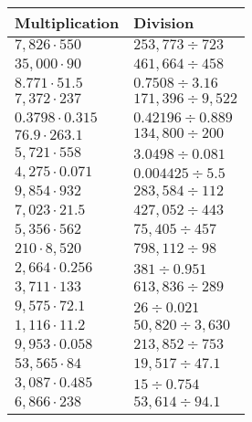 \begin{longtable}[]{@{}ll@{}}
\toprule
Multiplication & Division\tabularnewline
\midrule
\endhead
\(7,826\cdot550\) & \(253,773÷723\)\tabularnewline
\(35,000\cdot90\) & \(461,664÷458\)\tabularnewline
\(8.771\cdot51.5\) & \(0.7508÷3.16\)\tabularnewline
\(7,372\cdot237\) & \(171,396÷9,522\)\tabularnewline
\(0.3798\cdot0.315\) & \(0.42196÷0.889\)\tabularnewline
\(76.9\cdot263.1\) & \(134,800÷200\)\tabularnewline
\(5,721\cdot558\) & \(3.0498÷0.081\)\tabularnewline
\(4,275\cdot0.071\) & \(0.004425÷5.5\)\tabularnewline
\(9,854\cdot932\) & \(283,584÷112\)\tabularnewline
\(7,023\cdot21.5\) & \(427,052÷443\)\tabularnewline
\(5,356\cdot562\) & \(75,405÷457\)\tabularnewline
\(210\cdot8,520\) & \(798,112÷98\)\tabularnewline
\(2,664\cdot0.256\) & \(381÷0.951\)\tabularnewline
\(3,711\cdot133\) & \(613,836÷289\)\tabularnewline
\(9,575\cdot72.1\) & \(26÷0.021\)\tabularnewline
\(1,116\cdot11.2\) & \(50,820÷3,630\)\tabularnewline
\(9,953\cdot0.058\) & \(213,852÷753\)\tabularnewline
\(53,565\cdot84\) & \(19,517÷47.1\)\tabularnewline
\(3,087\cdot0.485\) & \(15÷0.754\)\tabularnewline
\(6,866\cdot238\) & \(53,614÷94.1\)\tabularnewline
\bottomrule
\end{longtable}
